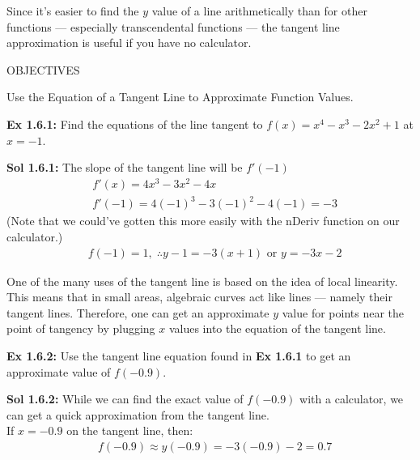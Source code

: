 Since it's easier to find the $y$ value of a line arithmetically than for other functions --- especially transcendental functions --- the tangent line approximation is useful if you have no calculator. \par

\begin{tcolorbox}[objective]
    \begin{center}
        OBJECTIVES \\[11pt]
    \end{center}
    Use the Equation of a Tangent Line to Approximate Function Values.
\end{tcolorbox} \vspace{11pt}

\begin{tcolorbox}[example]
    \textbf{Ex 1.6.1: } Find the equations of the line tangent to $f(x) = x^4 - x^3 - 2x^2 + 1$ at $x = -1$. 
\end{tcolorbox}
\begin{tcolorbox}[solution]
    \textbf{Sol 1.6.1: } The slope of the tangent line will be $f'(-1)$ \begin{align*}
        & f'(x) = 4x^3 - 3x^2 - 4x \\[11pt]
        & f'(-1) = 4(-1)^3 - 3(-1)^2 - 4(-1) = -3 
    \end{align*} 
    (Note that we could've gotten this more easily with the nDeriv function on our calculator.) \begin{align*}
        & f(-1) = 1, \; \therefore \boxed{y - 1 = -3(x + 1)} \text{ or } \boxed{y = -3x - 2} 
    \end{align*} 
\end{tcolorbox}

One of the many uses of the tangent line is based on the idea of local linearity. This means that in small areas, algebraic curves act like lines --- namely their tangent lines. Therefore, one can get an approximate $y$ value for points near the point of tangency by plugging $x$ values into the equation of the tangent line. \par

\begin{tcolorbox}[example]
    \textbf{Ex 1.6.2: } Use the tangent line equation found in \textbf{Ex 1.6.1} to get an approximate value of $f(-0.9)$. 
\end{tcolorbox}
\begin{tcolorbox}[solution]
    \textbf{Sol 1.6.2: } While we can find the exact value of $f(-0.9)$ with a calculator, we can get a quick approximation from the tangent line. \\[11pt]
    If $x = -0.9$ on the tangent line, then: \begin{align*}
        & f(-0.9) \approx y(-0.9) = -3(-0.9) - 2 = \boxed{0.7}
    \end{align*}
\end{tcolorbox}

